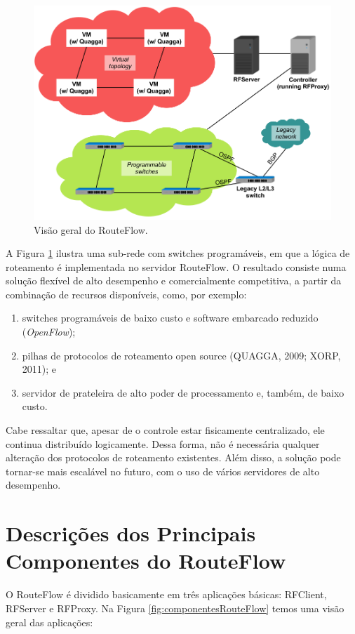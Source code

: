 \begin{figure}[h]
\centering
\includegraphics[width=160mm]{visaoGeralRouteFlow.png}
\caption{Visão geral do RouteFlow.}
\label{fig:visaoGeralRouteFlow} 
\end{figure}

A Figura \ref{fig:visaoGeralRouteFlow} ilustra uma sub-rede com
switches programáveis, em que a lógica de roteamento é
implementada no servidor RouteFlow. O resultado consiste
numa solução flexível de alto desempenho e comercialmente
competitiva, a partir da combinação de recursos disponíveis,
como, por exemplo:

\begin{enumerate}[{a)}] 
\item switches programáveis de baixo
custo e software embarcado reduzido (\textit{OpenFlow}); 
\item pilhas de protocolos de roteamento open source (QUAGGA, 2009; XORP,
2011); e 
\item servidor de prateleira de alto poder de
processamento e, também, de baixo custo. 
\end{enumerate}

Cabe ressaltar que, apesar de o controle estar fisicamente
centralizado, ele continua distribuído logicamente. Dessa
forma, não é necessária qualquer alteração dos protocolos de
roteamento existentes. Além disso, a solução pode tornar-se
mais escalável no futuro, com o uso
de vários servidores de alto desempenho.

\section{Descrições dos Principais Componentes do RouteFlow}
O RouteFlow é dividido basicamente em três aplicações
básicas: RFClient, RFServer e RFProxy. Na Figura
\ref{fig:componentesRouteFlow} temos uma visão geral das
aplicações:

